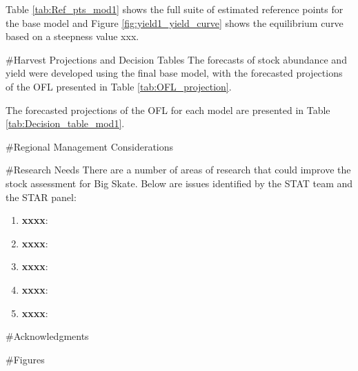 \documentclass[12pt,]{article}
\begin{document}
Table \ref{tab:Ref_pts_mod1} shows the full suite of estimated reference
points for the base model and Figure \ref{fig:yield1_yield_curve} shows
the equilibrium curve based on a steepness value xxx.

\newpage

\#Harvest Projections and Decision Tables The forecasts of stock
abundance and yield were developed using the final base model, with the
forecasted projections of the OFL presented in Table
\ref{tab:OFL_projection}.

The forecasted projections of the OFL for each model are presented in
Table \ref{tab:Decision_table_mod1}.

\newpage

\#Regional Management Considerations \newpage

\#Research Needs There are a number of areas of research that could
improve the stock assessment for Big Skate. Below are issues identified
by the STAT team and the STAR panel:

\begin{enumerate}

\item \textbf{xxxx}: 

\item \textbf{xxxx}:

\item \textbf{xxxx}:

\item \textbf{xxxx}:

\item \textbf{xxxx}:

\end{enumerate}

\#Acknowledgments

\newpage
\FloatBarrier
\newpage

\FloatBarrier

\FloatBarrier

\FloatBarrier
\newpage

\newpage
\FloatBarrier

\FloatBarrier

\FloatBarrier

\FloatBarrier

\newpage

\FloatBarrier

\newpage

\#Figures
\end{document}
